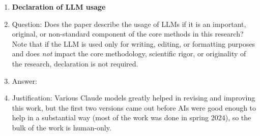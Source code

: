 \begin{enumerate}
	\item {\bf Declaration of LLM usage}
	\item[] Question: Does the paper describe the usage of LLMs if it is an important, original, or non-standard component of the core methods in this research? Note that if the LLM is used only for writing, editing, or formatting purposes and does \emph{not} impact the core methodology, scientific rigor, or originality of the research, declaration is not required.
	\item[] Answer: \answerNA{} %
	\item[] Justification: Various Claude models greatly helped in revising and improving this work, but the first two versions came out before AIs were good enough to help in a substantial way (most of the work was done in spring 2024), so the bulk of the work is human-only.

\end{enumerate}
